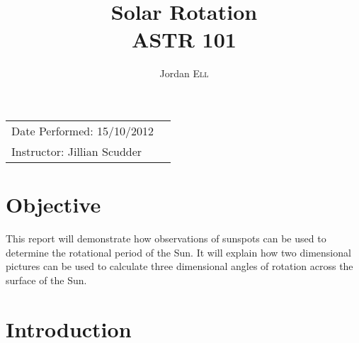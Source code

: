 \documentclass{article}
\title{Solar Rotation \\ ASTR 101} %
\author{Jordan \textsc{Ell}} %
\begin{document}
\maketitle %

\begin{tabular}{lr}
Date Performed: 15/10/2012\\ %
Instructor: Jillian Scudder %
\end{tabular}

\setlength\parindent{0pt} %

\renewcommand{\labelenumi}{\alph{enumi}.} %


\section{Objective}

This report will demonstrate how observations of sunspots can be used to determine the rotational period of the Sun. It will explain
how two dimensional pictures can be used to calculate three dimensional angles of rotation across the surface of the Sun.\\
 

\section{Introduction}
\end{document}

